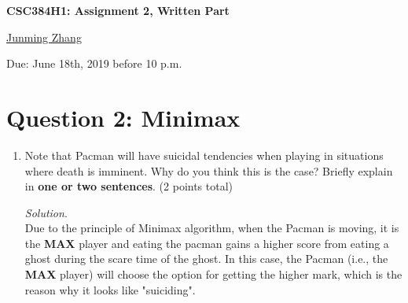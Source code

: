 \documentclass[10pt]{article}
\begin{document}
\begin{center}
\Large \textbf{CSC384H1: Assignment 2, Written Part}

\vspace{1mm}
\large {\href{mailto:junmingpeter.zhang@mail.utoronto.ca?Subject=CSC384H1: Assignment 2}{Junming Zhang}} 

\vspace{1mm}
\large {Due: June 18th, 2019 before 10 p.m.}
\end{center}

\section*{Question 2: Minimax}
\begin{enumerate}
    \item Note that Pacman will have suicidal tendencies when playing in situations where death is imminent. Why do you think this is the case? Briefly explain in \textbf{one or two sentences}. (2 points total)
\begin{mdframed}[leftmargin=-6.5mm]
\textit{Solution}.\\
Due to the principle of Minimax algorithm, when the Pacman is moving, it is the \textbf{MAX} player and
eating the pacman gains a higher score from eating a ghost during the scare time of the ghost. In this case, the Pacman (i.e., the \textbf{MAX} player) will choose the option for getting the higher mark, which is the reason why it looks like "suiciding".
\end{mdframed}
\end{enumerate}
\end{document}

